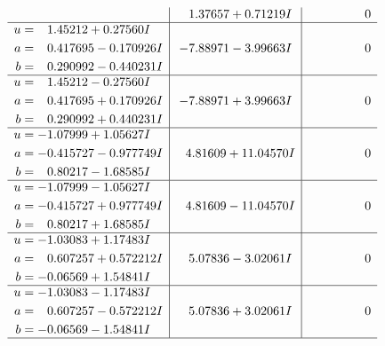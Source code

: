 \documentclass[1p]{elsarticle_modified}
\theoremstyle{definition}
\begin{document}
$$\begin{array}{c|c|c}
 & \phantom{-}1.37657 + 0.71219 I & \phantom{-0.000000 } 0 \\ \hline\begin{aligned}
u &= \phantom{-}1.45212 + 0.27560 I \\
a &= \phantom{-}0.417695 - 0.170926 I \\
b &= \phantom{-}0.290992 - 0.440231 I\end{aligned}
 & -7.88971 - 3.99663 I & \phantom{-0.000000 } 0 \\ \hline\begin{aligned}
u &= \phantom{-}1.45212 - 0.27560 I \\
a &= \phantom{-}0.417695 + 0.170926 I \\
b &= \phantom{-}0.290992 + 0.440231 I\end{aligned}
 & -7.88971 + 3.99663 I & \phantom{-0.000000 } 0 \\ \hline\begin{aligned}
u &= -1.07999 + 1.05627 I \\
a &= -0.415727 - 0.977749 I \\
b &= \phantom{-}0.80217 - 1.68585 I\end{aligned}
 & \phantom{-}4.81609 + 11.04570 I & \phantom{-0.000000 } 0 \\ \hline\begin{aligned}
u &= -1.07999 - 1.05627 I \\
a &= -0.415727 + 0.977749 I \\
b &= \phantom{-}0.80217 + 1.68585 I\end{aligned}
 & \phantom{-}4.81609 - 11.04570 I & \phantom{-0.000000 } 0 \\ \hline\begin{aligned}
u &= -1.03083 + 1.17483 I \\
a &= \phantom{-}0.607257 + 0.572212 I \\
b &= -0.06569 + 1.54841 I\end{aligned}
 & \phantom{-}5.07836 - 3.02061 I & \phantom{-0.000000 } 0 \\ \hline\begin{aligned}
u &= -1.03083 - 1.17483 I \\
a &= \phantom{-}0.607257 - 0.572212 I \\
b &= -0.06569 - 1.54841 I\end{aligned}
 & \phantom{-}5.07836 + 3.02061 I & \phantom{-0.000000 } 0\\
 \hline 
 \end{array}$$\newpage$$\begin{array}{c|c|c}  

\end{array}$$
\end{document}
